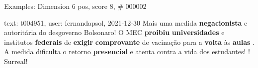 \begin{frame}{Examples: Dimension 6 pos, score 8, \# 000002}
\footnotesize
\begin{exampleblock}{text: t004951, user: fernandapsol, 2021-12-30}
Mais uma medida \textbf{negacionista} e autoritária do desgoverno Bolsonaro! O 
MEC \textbf{proibiu} \textbf{universidades} e institutos \textbf{federais} de 
\textbf{exigir} \textbf{comprovante} de vacinação para a \textbf{volta} às 
\textbf{aulas} . A medida dificulta o retorno \textbf{presencial} e atenta 
contra a vida dos estudantes! ! Surreal! 
\end{exampleblock}
\end{frame}
